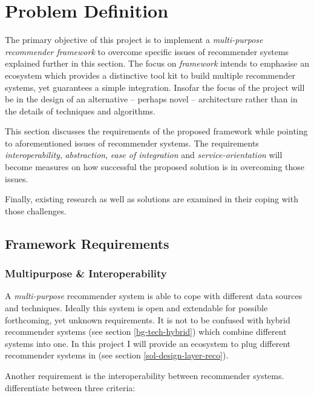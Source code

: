 \chapter{Problem Definition}
\label{problem}

The primary objective of this project is to implement a \textit{multi-purpose recommender framework} to overcome specific issues of recommender systems explained further in this section. The focus on \emph{framework} intends to emphasise an ecosystem which provides a distinctive tool kit to build multiple recommender systems, yet guarantees a simple integration. Insofar the focus of the project will be in the design of an alternative -- perhaps novel -- architecture rather than in the details of techniques and algorithms.

This section discusses the requirements of the proposed framework while pointing to aforementioned issues of recommender systems. The requirements \emph{interoperability}, \emph{abstraction}, \emph{ease of integration} and \emph{service-orientation} will become measures on how successful the proposed solution is in overcoming those issues.

Finally, existing research as well as solutions are examined in their coping with those challenges.



\section{Framework Requirements}

\subsection{Multipurpose \& Interoperability}
\label{problem-multipurpose}

A \emph{multi-purpose} recommender system is able to cope with different data sources and techniques. Ideally this system is open and extendable for possible forthcoming, yet unknown requirements. It is not to be confused with hybrid recommender systems (see section \ref{bg-tech-hybrid}) which combine different systems into one. In this project I will provide an ecosystem to plug different recommender systems in (see section \ref{sol-design-layer-reco}).

Another requirement is the interoperability between recommender systems. \citet{manouselis07} differentiate between three criteria:

